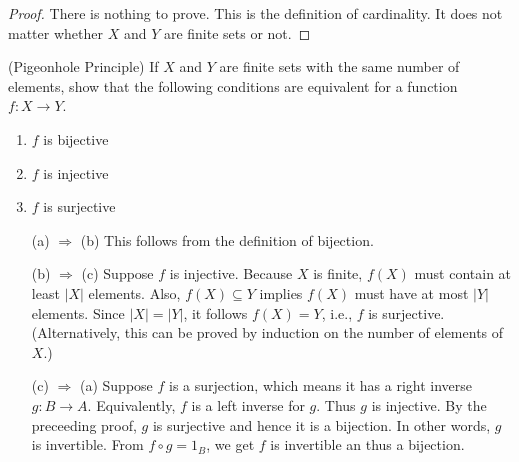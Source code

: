 \begin{questions}
\begin{proof} There is nothing to prove. This is the definition of cardinality. It does not matter whether \(X\) and \(Y\) are finite sets or not.
\end{proof}


\question
    (Pigeonhole Principle)
    If \(X\) and \(Y\) are finite sets with the same number of elements, show that the following conditions are equivalent for a function \(f\colon X \rightarrow Y\).
    \begin{enumerate}[label=(\alph*)]
        \item \(f\) is bijective
        \item \(f\) is injective
        \item \(f\) is surjective
    \end{enumerate}
\begin{theproof} \hfill
\begin{itemize}[left=0.7in]
    \item[(a) \(\Rightarrow\) (b)] This follows from the definition of bijection.
    
    \item[(b) \(\Rightarrow\) (c)] Suppose \(f\) is injective. 
    Because \(X\) is finite, \(f(X)\) must contain at least \(|X|\) elements. Also, \(f(X)\subseteq Y\) implies \(f(X)\) must have  at most \(|Y|\) elements. Since \(|X| = |Y|\), it follows  \(f(X) = Y\), i.e., \(f\) is surjective.
    (Alternatively, this can be proved by induction on the number of elements of \(X\).)
    
    \item[(c) \(\Rightarrow\) (a)] Suppose \(f\) is a surjection, which means it has a right inverse \(g\colon B\to A\). 
    Equivalently,  \(f\) is a left inverse for \(g\). 
    Thus \(g\) is injective. By the preceeding proof, \(g\) is surjective and hence it is a bijection. In other words, \(g\) is invertible.
    From \(f\circ g = 1_B\), we get \(f\)  is invertible an thus a bijection.
\end{itemize}


\end{theproof}
\end{questions}
